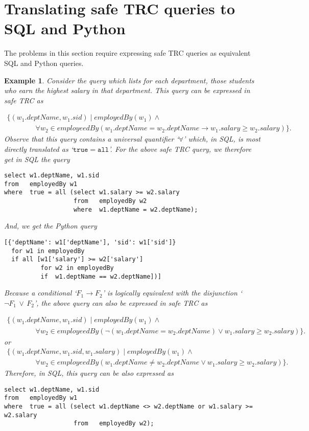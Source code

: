 \documentclass{article}
\newtheorem{example}{Example}
\begin{document}
\newpage
\section{Translating safe TRC queries to SQL and Python}


The problems in this section require expressing safe TRC queries as equivalent SQL and Python queries.
\begin{example}\label{translateTRC}
Consider the query which lists for each department, those students who earn the highest salary in that department.   This query can be expressed in safe TRC as
{\small
\[
\begin{array}{ll}
\{(w_1.deptName, w_1.sid)\mid employedBy(w_1) \land \\
\qquad\qquad \forall w_2\in employeedBy(w_1.deptName = w_2.deptName  \rightarrow w_1.salary \geq w_2.salary)\}.
\end{array}
\]
%
Observe that this query contains a universal quantifier `$\forall$' which, in SQL, is most directly translated 
as `$\mathtt{true = all}$'.   For the above safe TRC query, we therefore get in SQL the query
\begin{verbatim}
select w1.deptName, w1.sid
from   employedBy w1
where  true = all (select w1.salary >= w2.salary
                   from   employedBy w2
                   where  w1.deptName = w2.deptName);
\end{verbatim}

And, we get the Python query
\begin{verbatim}
[{'deptName': w1['deptName'], 'sid': w1['sid']}
  for w1 in employedBy 
  if all [w1['salary'] >= w2['salary']
          for w2 in employedBy 
          if  w1.deptName == w2.deptName])]
\end{verbatim}
}

\noindent
Because a conditional `$F_1 \rightarrow F_2$' is logically equivalent with the disjunction 
`$\lnot F_1\,\lor\, F_2$', the above query can also be expressed in safe TRC as
{\small
\[
\begin{array}{ll}
\{(w_1.deptName, w_1.sid)\mid employedBy(w_1) \land \\
\qquad\qquad \forall w_2\in employeedBy(\lnot(w_1.deptName = w_2.deptName)  \lor w_1.salary \geq w_2.salary)\}.
\end{array}
\]
or
{\small
\[
\begin{array}{ll}
\{(w_1.deptName, w_1.sid, w_1.salary)\mid employedBy(w_1) \land \\
\qquad\qquad \forall w_2\in employeedBy(w_1.deptName \neq w_2.deptName \lor w_1.salary \geq w_2.salary)\}.
\end{array}
\]
}
%
Therefore, in SQL, this query can be also expressed as 
\begin{verbatim}
select w1.deptName, w1.sid
from   employedBy w1
where  true = all (select w1.deptName <> w2.deptName or w1.salary >= w2.salary
                   from   employedBy w2);
\end{verbatim}

}
\end{example}
\end{document}
